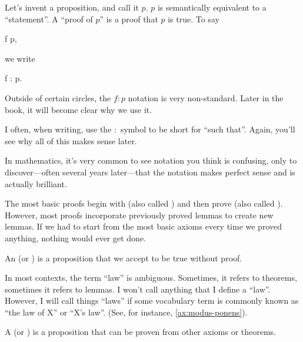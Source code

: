 

Let's invent a proposition, and call it $p$. $p$ is semantically
equivalent to a ``statement''. A ``proof of $p$'' is a proof that $p$
is true. To say

\begin{zz}
  f  p,
\end{zz}

we write

\begin{zz}
  f : p.
\end{zz}

\begin{remark}
  Outside of certain circles, the $f : p$ notation is very
  non-standard. Later in the book, it will become clear why we use it.

  I often, when writing, use the $:$ symbol to be short for ``such
  that''. Again, you'll see why all of this makes sense later.
\end{remark}

\begin{aside}
  In mathematics, it's very common to see notation you think is
  confusing, only to discover---often several years later---that the
  notation makes perfect sense and is actually brilliant.
\end{aside}

The most basic proofs begin with  (also called
) and then prove  (also called
). However, most proofs incorporate previously proved
lemmas to create new lemmas. If we had to start from the most basic
axioms every time we proved anything, nothing would ever get done.

\begin{definition}
  \label{def:axiom}
  \label{def:postulate}
  An  (or ) is a proposition that we
  accept to be true without proof.
\end{definition}

\begin{remark}
  \label{r:law}
  In most contexts, the term ``law'' is ambiguous. Sometimes, it
  refers to theorems, sometimes it refers to lemmas. I won't call
  anything that I define a ``law''. However, I will call things
  ``laws'' if some vocabulary term is commonly known as ``the law of
  X'' or ``X's law''. (See, for instance, \cref{ax:modus-ponens}).
\end{remark}

\begin{definition}
  \label{def:theorem}
  A  (or ) is a proposition that can be
  proven from other axioms or theorems.
\end{definition}

